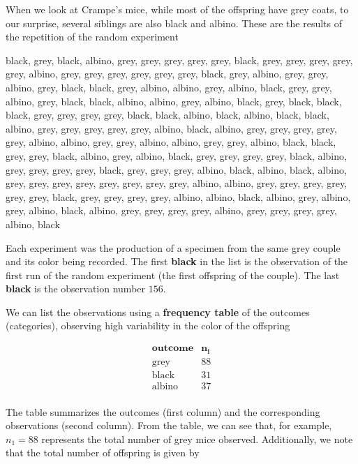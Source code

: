 \documentclass[
]{book}
\begin{document}
When we look at Crampe's mice, while most of the offspring have grey coats, to our surprise, several siblings are also black and albino. These are the results of the repetition of the random experiment

black, grey, black, albino, grey, grey, grey, grey, grey, black, grey, grey, grey, grey, grey, albino, grey, grey, grey, grey, grey, grey, black, grey, albino, grey, grey, albino, grey, black, black, grey, albino, albino, grey, albino, black, grey, grey, albino, grey, black, black, albino, albino, grey, albino, black, grey, black, black, black, grey, grey, grey, grey, black, black, albino, black, albino, black, black, albino, grey, grey, grey, grey, grey, albino, black, albino, grey, grey, grey, grey, grey, albino, albino, grey, grey, albino, albino, grey, grey, albino, black, black, grey, grey, black, albino, grey, albino, black, grey, grey, grey, grey, black, albino, grey, grey, grey, grey, black, grey, grey, grey, albino, black, albino, black, albino, grey, grey, grey, grey, grey, grey, grey, grey, albino, albino, grey, grey, grey, grey, grey, grey, black, grey, grey, grey, grey, albino, albino, black, albino, grey, albino, grey, albino, black, albino, grey, grey, grey, grey, albino, grey, grey, grey, grey, albino, black

Each experiment was the production of a specimen from the same grey couple and its color being recorded. The first \textbf{black} in the list is the observation of the first run of the random experiment (the first offspring of the couple). The last \textbf{black} is the observation number \(156\).

We can list the observations using a \textbf{frequency table} of the outcomes (categories), observing high variability in the color of the offspring

\[
\begin{array}{cc}
\mathbf{outcome} & \mathbf{n_i}  \\
\text{grey}  & 88     \\
\text{black}   & 31    \\ 
\text{albino}  & 37   \\ 
\end{array}
\]

The table summarizes the outcomes (first column) and the corresponding observations (second column). From the table, we can see that, for example, \(n_1=88\) represents the total number of grey mice observed. Additionally, we note that the total number of offspring is given by
\end{document}

